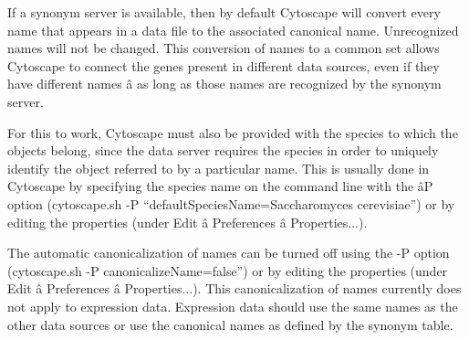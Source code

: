  If a synonym server is available, then by default Cytoscape will convert every name that appears in a data file to the associated canonical name. Unrecognized names will not be changed. This conversion of names to a common set allows Cytoscape to connect the genes present in different data sources, even if they have different names \^a as long as those names are recognized by the synonym server. 


 For this to work, Cytoscape must also be provided with the species to which the objects belong, since the data server requires the species in order to uniquely identify the object referred to by a particular name. This is usually done in Cytoscape by specifying the species name on the command line with the \^aP option (cytoscape.sh -P ``defaultSpeciesName=Saccharomyces cerevisiae'') or by editing the properties (under Edit \^a Preferences \^a Properties...). 

 The automatic canonicalization of names can be turned off using the -P option (cytoscape.sh -P canonicalizeName=false'') or by editing the properties (under Edit \^a Preferences \^a Properties...). This canonicalization of names currently does not apply to expression data. Expression data should use the same names as the other data sources or use the canonical names as defined by the synonym table. 
